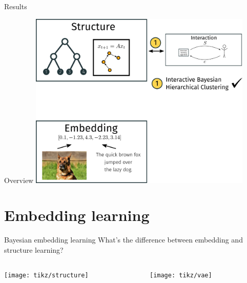\documentclass[10pt, compress]{beamer}
\begin{document}
\begin{frame}{Results}
  \centering
  \vspace{10pt}
\end{frame}

\begin{frame}{Overview}
  \centering
  \includegraphics[width=0.8\textwidth]{img/overview-1}
\end{frame}

\section{Embedding learning}

\begin{frame}{Bayesian embedding learning}
  \centering
  What's the difference between embedding and structure learning?
  \pause
  \begin{center}
    \begin{columns}
      \begin{column}{0.3\textwidth}
        \texttt{[image: tikz/structure]}
      \end{column}
    \pause
      \begin{column}{0.3\textwidth}
        \texttt{[image: tikz/vae]}
      \end{column}
    \end{columns}
  \end{center}
\end{frame}
\end{document}
